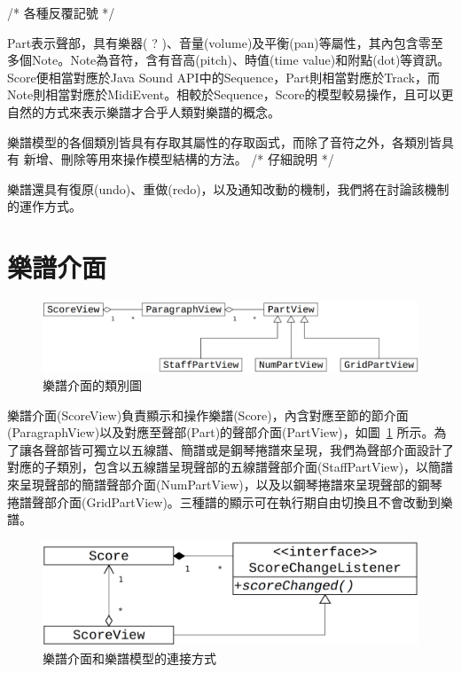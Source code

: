 \documentclass[12pt,a4paper,oneside]{report}
\begin{document}
/* 各種反覆記號  */ 

Part表示聲部，具有樂器( ? )、音量(volume)及平衡(pan)等屬性，其內包含零至多個Note。Note為音符，含有音高(pitch)、時值(time value)和附點(dot)等資訊。Score便相當對應於Java Sound API中的Sequence，Part則相當對應於Track，而Note則相當對應於MidiEvent。相較於Sequence，Score的模型較易操作，且可以更自然的方式來表示樂譜才合乎人類對樂譜的概念。

樂譜模型的各個類別皆具有存取其屬性的存取函式，而除了音符之外，各類別皆具有
新增、刪除等用來操作模型結構的方法。 /*  
仔細說明  
*/

樂譜還具有復原(undo)、重做(redo)，以及通知改動的機制，我們將在討論該機制的運作方式。


\section{樂譜介面}


\begin{figure}[htb]
\centering
\includegraphics[scale=0.1]{img/view.png}
\caption{ 樂譜介面的類別圖 }
\label{fig:view}
\end{figure}

樂譜介面(ScoreView)負責顯示和操作樂譜(Score)，內含對應至節的節介面(ParagraphView)以及對應至聲部(Part)的聲部介面(PartView)，如圖~\ref{fig:view} 所示。為了讓各聲部皆可獨立以五線譜、簡譜或是鋼琴捲譜來呈現，我們為聲部介面設計了對應的子類別，包含以五線譜呈現聲部的五線譜聲部介面(StaffPartView)，以簡譜來呈現聲部的簡譜聲部介面(NumPartView)，以及以鋼琴捲譜來呈現聲部的鋼琴捲譜聲部介面(GridPartView)。三種譜的顯示可在執行期自由切換且不會改動到樂譜。

\begin{figure}[htb]
\centering
\includegraphics[scale=0.1]{img/model_view.png}
\caption{ 樂譜介面和樂譜模型的連接方式 }
\label{fig:model_view}
\end{figure}
\end{document}

